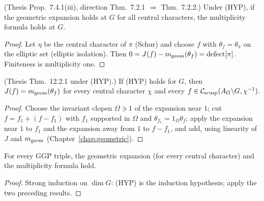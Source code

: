 \begin{proposition}
\label{multAt_of_hyp_geom}
\leanok
{}
(Thesis Prop.~7.4.1(iii), direction Thm.~7.2.1 $\Rightarrow$ Thm.~7.2.2.) Under (HYP), if the geometric
expansion holds at $G$ for all central characters, the multiplicity formula holds at $G$.
\end{proposition}
\begin{proof}
\leanok
{}
Let $\eta$ be the central character of $\pi$ (Schur) and choose $f$ with $\theta_f=\theta_\pi$ on the elliptic set
(elliptic isolation). Then $0=J(f)-m_{\mathrm{geom}}(\theta_f)=\mathrm{defect}[\pi]$. Finiteness is multiplicity one.
\end{proof}

\begin{theorem}
\label{geomAt_of_hyp}
\leanok
{}
(Thesis Thm.~12.2.1 under (HYP).) If (HYP) holds for $G$, then $J(f)=m_{\mathrm{geom}}(\theta_f)$ for every central
character $\chi$ and every $f\in\mathcal{C}_{\mathrm{scusp}}(A_G\backslash G,\chi^{-1})$.
\end{theorem}
\begin{proof}
\leanok
{}
Choose the invariant clopen $\Omega\ni1$ of the expansion near $1$; cut $f=f_1+(f-f_1)$ with $f_1$ supported in $\Omega$
and $\theta_{f_1}=1_\Omega\theta_f$; apply the expansion near $1$ to $f_1$ and the expansion away from $1$ to
$f-f_1$, and add, using linearity of $J$ and $m_{\mathrm{geom}}$ (Chapter~\ref{chap:geometric}).
\end{proof}

\begin{theorem}
\label{geom_mult_all}
\leanok
{}
For every GGP triple, the geometric expansion (for every central character) and the multiplicity formula hold.
\end{theorem}
\begin{proof}
\leanok
{}
Strong induction on $\dim G$: (HYP) is the induction hypothesis; apply the two preceding results.
\end{proof}

